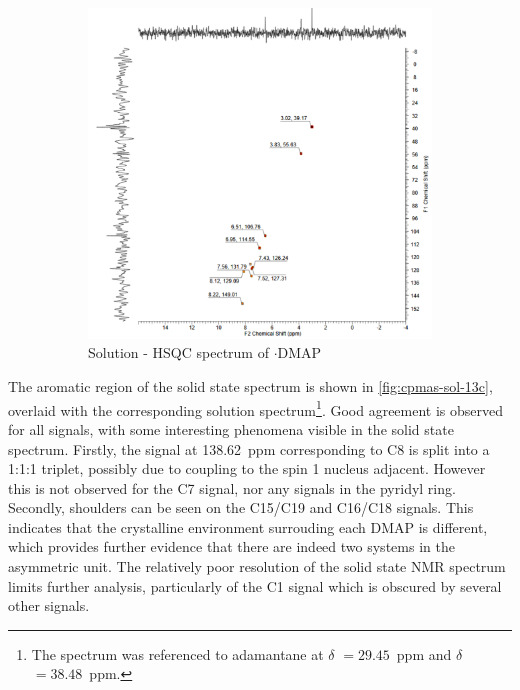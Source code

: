 \begin{refsection}
\begin{figure}
    \begin{subfigure}[t]{\linewidth}
    \centering
    \includegraphics[width=0.75\linewidth]{Figures/ebs-4ome-dmap-sol-hsqc.pdf}
    \caption{Solution - HSQC spectrum of $\cdot$DMAP}
    \label{fig:ebs-4ome-dmap-sol-hsqc}
    \end{subfigure}
    \caption{}
    \label{fig:ebs-4ome-dmap-sol}
\end{figure}

The aromatic region of the solid state  spectrum is shown in \cref{fig:cpmas-sol-13c}, overlaid with the corresponding solution spectrum\footnote{The  spectrum was referenced to adamantane at $\delta$ $= 29.45$~ppm and $\delta$ $= 38.48$~ppm.\autocite{Morcombe2003}}.
Good agreement is observed for all signals, with some interesting phenomena visible in the solid state spectrum.
Firstly, the signal at 138.62~ppm corresponding to C8 is split into a 1:1:1 triplet, possibly due to coupling to the spin 1  nucleus adjacent.
However this is not observed for the C7 signal, nor any signals in the pyridyl ring.
Secondly, shoulders can be seen on the C15/C19 and C16/C18 signals.
This indicates that the crystalline environment surrouding each DMAP is different, which provides further evidence that there are indeed two systems in the asymmetric unit.
The relatively poor resolution of the solid state  NMR spectrum limits further analysis, particularly of the C1 signal which is obscured by several other signals.


\end{refsection}
